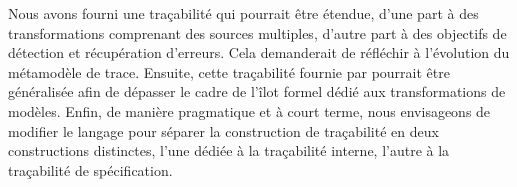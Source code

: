 Nous avons fourni une traçabilité qui pourrait être étendue, d'une part à des
transformations comprenant des sources multiples, d'autre part à des objectifs
de détection et récupération d'erreurs. Cela demanderait de réfléchir à
l'évolution du métamodèle de trace. Ensuite, cette traçabilité fournie par
{\tom} pourrait être généralisée afin de dépasser le cadre de l'îlot formel
dédié aux transformations de modèles. Enfin, de manière pragmatique et à court
terme, nous envisageons de modifier le langage pour séparer la construction de
traçabilité en deux constructions distinctes, l'une dédiée à la traçabilité
interne, l'autre à la traçabilité de spécification.



